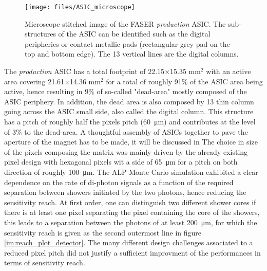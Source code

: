 		\begin{figure}[h]
			\centering
			\texttt{[image: files/ASIC\_microscope]}
			\caption{Microscope stitched image of the FASER \textit{production} ASIC. The sub-structures of the ASIC can be identified such as the digital peripheries or contact metallic pads (rectangular grey pad on the top and bottom edge). The 13 vertical lines are the digital columns.}
			\label{im:ASIC_microscope}
		\end{figure}
		
		The \textit{production} ASIC has a total footprint of 22.15$\times$15.35 mm$^2$ with an active area covering 21.61$\times$14.36 mm$^2$ for a total of roughly 91\% of the ASIC area being active, hence resulting in 9\% of so-called "dead-area" mostly composed of the ASIC periphery. In addition, the dead area is also composed by 13 thin column going across the ASIC small side, also called the digital column. This structure has a pitch of roughly half the pixels pitch (\SI{60}{\micro\meter}) and contributes at the level of 3\% to the dead-area. A thoughtful assembly of ASICs together to pave the aperture of the magnet has to be made, it will be discussed in  
		The choice in size of the pixels composing the matrix was mainly driven by the already existing pixel design with hexagonal pixels wit a side of \SI{65}{\micro\meter} for a pitch on both direction of roughly \SI{100}{\micro\meter}. The ALP Monte Carlo simulation exhibited a clear dependence on the rate of di-photon signals as a function of the required separation between showers initiated by the two photons, hence reducing the sensitivity reach. At first order, one can distinguish two different shower cores if there is at least one pixel separating the pixel containing the core of the showers, this leads to a separation between the photons of at least \SI{200}{\micro\meter}, for which the sensitivity reach is given as the second outermost line in figure \ref{im:reach_plot_detector}. The many different design challenges associated to a reduced pixel pitch did not justify a sufficient improvment of the performances in terms of sensitivity reach. 
		
